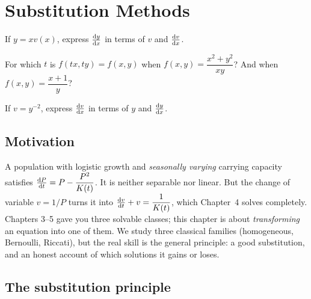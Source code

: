 \chapter{Substitution Methods}\label{ch:ch06}

\begin{diagnostic}
  \item If $y = xv(x)$, express $\frac{\mathrm{d}y}{\mathrm{d}x}$ in terms of $v$ and $\frac{\mathrm{d}v}{\mathrm{d}x}$.
  \item For which $t$ is $f(tx,ty) = f(x,y)$ when $f(x,y) = \dfrac{x^2 + y^2}{xy}$?
        And when $f(x,y) = \dfrac{x+1}{y}$?
  \item If $v = y^{-2}$, express $\frac{\mathrm{d}v}{\mathrm{d}x}$ in terms of $y$ and $\frac{\mathrm{d}y}{\mathrm{d}x}$.
\end{diagnostic}

\section{Motivation}\label{sec:ch06-motivation}

A population with logistic growth and \emph{seasonally varying} carrying capacity
satisfies $\frac{\mathrm{d}P}{\mathrm{d}t} = P - \dfrac{P^2}{K(t)}$. It is neither separable nor
linear. But the change of variable $v = 1/P$ turns it into
$\frac{\mathrm{d}v}{\mathrm{d}t} + v = \dfrac{1}{K(t)}$, which Chapter~4 solves completely. Chapters
3--5 gave you three solvable classes; this chapter is about \emph{transforming}
an equation into one of them. We study three classical families (homogeneous,
Bernoulli, Riccati), but the real skill is the general principle: a good
substitution, and an honest account of which solutions it gains or loses.

\section{The substitution principle}\label{sec:ch06-principle}


